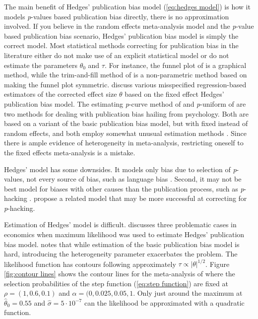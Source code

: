 \documentclass[article]{ajs}
\numberwithin{equation}{section}
\numberwithin{figure}{section}
\theoremstyle{plain}
\theoremstyle{definition}
\theoremstyle{definition}
\theoremstyle{plain}
\begin{document}
The main benefit of Hedges' publication bias model (\ref{eq:hedges model}) is how it models \textit{p}-values based publication bias directly, there is no approximation involved. If you believe in the random effects meta-analysis model and the \textit{p}-value based publication bias scenario, Hedges' publication bias model is simply the correct model. Most statistical methods correcting for publication bias in the literature either do not make use of an explicit statistical model or do not estimate the parameters $\theta_{0}$ and $\tau$. For instance, the funnel plot of \citet{Egger1997-rd} is a graphical method, while the trim-and-fill method of \citet{Duval2000-ct} is a non-parametric method based on making the funnel plot symmetric. \citet{Stanley2005-ng,stanley2014meta} discuss various misspecified regression-based estimators of the corrected effect size $\theta$ based on the fixed effect Hedges' publication bias model. The estimating \textit{p}-curve method of \citet{Simonsohn2014-cn} and \textit{p}-uniform of \citet{Van_Assen2015-qs,Van_Aert2016-cu} are two methods for dealing with publication bias hailing from psychology. Both are based on a variant of the basic publication bias model, but with fixed instead of random effects, and both employ somewhat unusual estimation methods \citep{McShane2016-rb}. Since there is ample evidence of heterogeneity in meta-analysis, restricting oneself to the fixed effects meta-analysis is a mistake.

Hedges' model has some downsides. It models only bias due to selection
of \textit{p}-values, not every source of bias, such as language bias
\citep{Egger1998-kj}. Second, it may not be best model for biases
with other causes than the publication process, such as \textit{p}-hacking
\citep{simmons2011false}. \citet{moss2019modelling} propose a related
model that may be more successful at correcting for \textit{p}-hacking. 

Estimation of Hedges' model is difficult. \citet[Section 6.3]{Stanley2005-ng}
discusses three problematic cases in economics when maximum likelihood
was used to estimate Hedges' publication bias model. \citet[Appendix A]{McShane2016-rb}
notes that while estimation of the basic publication bias model is
hard, introducing the heterogeneity parameter exacerbates the problem.
The likelihood function has contours following approximately $\tau\propto|\theta|^{1/2}$.
Figure \ref{fig:contour lines} shows the contour lines for the meta-analysis
of \citet{Cuddy2018-kp} where the selection probabilities of the
step function (\ref{eq:step function}) are fixed at $\rho=(1,0.6,0.1)$ and $\alpha = (0, 0.025, 0.05, 1$. Only just around the maximum at $\hat{\theta}_{0}=0.55$ and $\hat{\sigma}=5\cdot10^{-7}$
can the likelihood be approximated with a quadratic function. 
\end{document}
